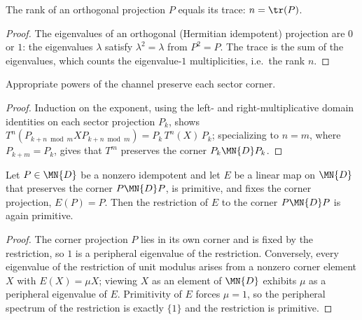 \begin{lemma}%
    \label{thm:corner_rank_eq_trace}
    \leanok
    The rank of an orthogonal projection $P$ equals its trace:
    $n=\tr(P)$.
\end{lemma}

\begin{proof}\leanok
    The eigenvalues of an orthogonal (Hermitian idempotent) projection are
    $0$ or $1$: the eigenvalues $\lambda$ satisfy $\lambda^2=\lambda$ from
    $P^2=P$. The trace is the sum of the eigenvalues, which counts the
    eigenvalue-$1$ multiplicities, i.e.\ the rank $n$.
\end{proof}

\begin{lemma}
    \label{lem:corner_pow_preserved}
    \leanok
    Appropriate powers of the channel preserve each sector corner.
\end{lemma}

\begin{proof}\leanok
    Induction on the exponent, using the left- and right-multiplicative
    domain identities on each sector projection $P_k$, shows
    $T^n(P_{k+n\bmod m}XP_{k+n\bmod m})=P_k\,T^n(X)\,P_k$; specializing to
    $n=m$, where $P_{k+m}=P_k$, gives that $T^m$ preserves the corner
    $P_k\MN{D}P_k$.
\end{proof}

\begin{lemma}
    \label{lem:primitivity_corner_restriction}
    \leanok
    Let $P\in\MN{D}$ be a nonzero idempotent and let $E$ be a linear map on
    $\MN{D}$ that preserves the corner $P\MN{D}P$, is primitive, and fixes
    the corner projection, $E(P)=P$. Then the restriction of $E$ to the
    corner $P\MN{D}P$ is again primitive.
\end{lemma}

\begin{proof}
    \leanok
    The corner projection $P$ lies in its own corner and is fixed by the
    restriction, so $1$ is a peripheral eigenvalue of the restriction.
    Conversely, every eigenvalue of the restriction of unit modulus arises
    from a nonzero corner element $X$ with $E(X)=\mu X$; viewing $X$ as an
    element of $\MN{D}$ exhibits $\mu$ as a peripheral eigenvalue of $E$.
    Primitivity of $E$ forces $\mu=1$, so the peripheral spectrum of the
    restriction is exactly $\{1\}$ and the restriction is primitive.
\end{proof}


